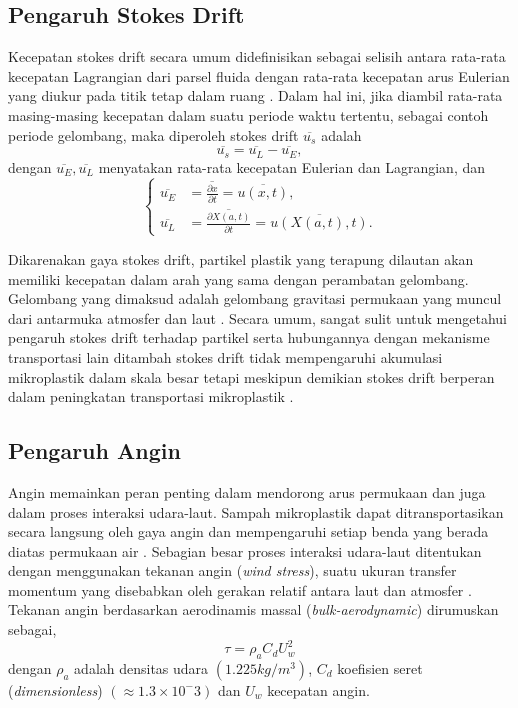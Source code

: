 \begin{spacing}{1.5}
\subsection[Pengaruh Stokes Drift]{Pengaruh Stokes Drift}
	Kecepatan stokes drift secara umum didefinisikan sebagai selisih antara rata-rata kecepatan Lagrangian dari parsel fluida dengan rata-rata kecepatan arus Eulerian yang diukur pada titik tetap dalam ruang . Dalam hal ini, jika diambil rata-rata masing-masing kecepatan dalam suatu periode waktu tertentu, sebagai contoh periode gelombang, maka diperoleh stokes drift $\overline{u_s}$ adalah
	\begin{equation}
		\overline{u_s}=\overline{u_L}-\overline{u_E},
	\end{equation}
	dengan $\overline{u_E},\overline{u_L}$ menyatakan rata-rata kecepatan Eulerian dan Lagrangian, dan
	\begin{equation*}
		\begin{cases}
			\overline{u_E} &= \overline{\frac{\partial x}{\partial t}} = \overline{u(x,t)}, \\
			\overline{u_L} &= \overline{\frac{\partial X(a,t)}{\partial t}} = \overline{u(X(a,t),t)}.
		\end{cases}	
	\end{equation*}
	\par Dikarenakan gaya stokes drift, partikel plastik yang terapung dilautan akan memiliki kecepatan dalam arah yang sama dengan perambatan gelombang. Gelombang yang dimaksud adalah gelombang gravitasi permukaan yang muncul dari antarmuka atmosfer dan laut . Secara umum, sangat sulit untuk mengetahui pengaruh stokes drift terhadap partikel serta hubungannya dengan mekanisme transportasi lain  ditambah stokes drift tidak mempengaruhi akumulasi mikroplastik dalam skala besar tetapi meskipun demikian stokes drift berperan dalam peningkatan transportasi mikroplastik .
\subsection[Pengaruh Angin]{Pengaruh Angin}
	Angin memainkan peran penting dalam mendorong arus permukaan dan juga dalam proses interaksi udara-laut. Sampah mikroplastik dapat ditransportasikan secara langsung oleh gaya angin dan mempengaruhi setiap benda yang berada diatas permukaan air . Sebagian besar proses interaksi udara-laut ditentukan dengan menggunakan tekanan angin (\textit{wind stress}), suatu ukuran transfer momentum yang disebabkan oleh gerakan relatif antara laut dan atmosfer . Tekanan angin berdasarkan aerodinamis massal (\textit{bulk-aerodynamic}) dirumuskan sebagai,
	\begin{equation}
		\tau = \rho_a C_d U_w^2
	\end{equation}
	dengan $\rho_a$ adalah densitas udara $(1.225 kg/m^3)$, $C_d$ koefisien seret (\textit{dimensionless}) $(\approx 1.3 \times 10^-3)$ dan $U_w$ kecepatan angin.
\end{spacing}
\vspace{-0.1pc}
